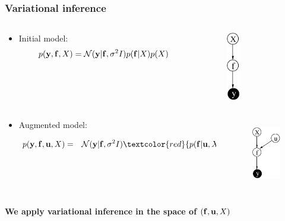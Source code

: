 \documentclass{beamer}
\begin{document}
\frame
{

\frametitle{Variational inference} 

\begin{columns}
\begin{column}[t]{8cm}

\begin{itemize}
\item Initial model:
$$
p(\mathbf{y},\mathbf{f},X) = \mathcal{N}(\mathbf{y}|\mathbf{f},\sigma^2
  I) p(\mathbf{f}|X) p(X) 
$$

\end{itemize}
\end{column}

\begin{column}[t]{3cm}
\begin{figure}
\includegraphics[width=8mm,height=30mm]{../../../vargplvm/tex/diagrams/net}
\end{figure}
\end{column}
\end{columns}

\begin{columns}
\begin{column}[t]{8cm}
\begin{itemize}

\item Augmented model:

\begin{eqnarray}
p(\bfy,\bff,\bfu, X) 
& = & \mathcal{N}(\bfy|\bff,\sigma^2I)
\textcolor{red}{p(\bff | \bfu, X) p(\bfu)} p(X) \nonumber
\end{eqnarray}

\end{itemize}
\end{column}
\begin{column}[t]{3cm}
\begin{figure}
\includegraphics[width=20mm,height=30mm]{../../../vargplvm/tex/diagrams/net2}
\end{figure}
\end{column}
\end{columns}

\vspace{0.2cm}
{\bf We apply variational inference in the space of $(\mathbf{f}, \mathbf{u}, X)$}

}
\end{document}
